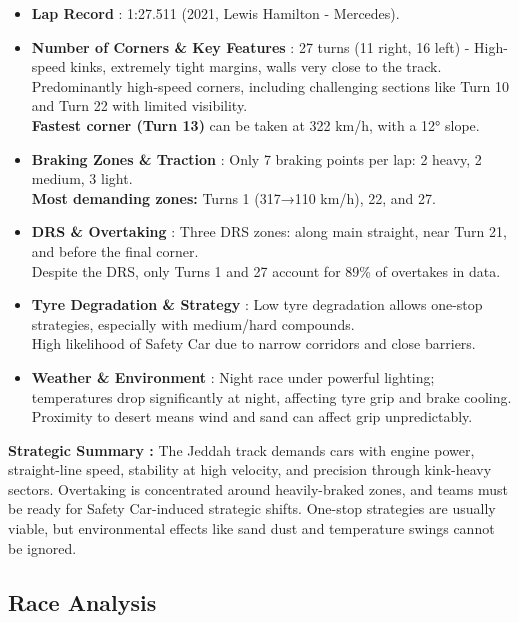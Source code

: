 \begin{itemize}
    \item \textbf{Lap Record} : 1:27.511 (2021, Lewis Hamilton - Mercedes).
    
    \item \textbf{Number of Corners \& Key Features} : 27 turns (11 right, 16 left)  - High-speed kinks, extremely tight margins, walls very close to the track.\\
    Predominantly high-speed corners, including challenging sections like Turn 10 and Turn 22 with limited visibility.\\
    \textbf{Fastest corner (Turn 13)} can be taken at 322 km/h, with a 12° slope.
    
    \item \textbf{Braking Zones \& Traction} : Only 7 braking points per lap: 2 heavy, 2 medium, 3 light.\\
    \textbf{Most demanding zones:} Turns 1 (317→110 km/h), 22, and 27.
    
    \item \textbf{DRS \& Overtaking} : Three DRS zones: along main straight, near Turn 21, and before the final corner. \\
    Despite the DRS, only Turns 1 and 27 account for 89\% of overtakes in data.
    
    \item \textbf{Tyre Degradation \& Strategy} : Low tyre degradation allows one-stop strategies, especially with medium/hard compounds. \\
    High likelihood of Safety Car due to narrow corridors and close barriers.
    
    \item \textbf{Weather \& Environment} : Night race under powerful lighting; temperatures drop significantly at night, affecting tyre grip and brake cooling.\\
    Proximity to desert means wind and sand can affect grip unpredictably.
\end{itemize}

\textbf{Strategic Summary :}
The Jeddah track demands cars with engine power, straight-line speed, stability at high velocity, and precision through kink-heavy sectors. Overtaking is concentrated around heavily-braked zones, and teams must be ready for Safety Car-induced strategic shifts. One-stop strategies are usually viable, but environmental effects like sand dust and temperature swings cannot be ignored.


\subsection{Race Analysis}

